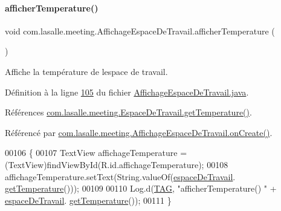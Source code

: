 \paragraph{\texorpdfstring{afficher\+Temperature()}{afficherTemperature()}}
{\footnotesize\ttfamily void com.\+lasalle.\+meeting.\+Affichage\+Espace\+De\+Travail.\+afficher\+Temperature (\begin{DoxyParamCaption}{ }\end{DoxyParamCaption})}



Affiche la température de l\textquotesingle{}espace de travail. 



Définition à la ligne \hyperlink{_affichage_espace_de_travail_8java_source_l00105}{105} du fichier \hyperlink{_affichage_espace_de_travail_8java_source}{Affichage\+Espace\+De\+Travail.\+java}.



Références \hyperlink{_espace_de_travail_8java_source_l00107}{com.\+lasalle.\+meeting.\+Espace\+De\+Travail.\+get\+Temperature()}.



Référencé par \hyperlink{_affichage_espace_de_travail_8java_source_l00041}{com.\+lasalle.\+meeting.\+Affichage\+Espace\+De\+Travail.\+on\+Create()}.


\begin{DoxyCode}
00106     \{
00107         TextView affichageTemperature = (TextView)findViewById(R.id.affichageTemperature);
00108         affichageTemperature.setText(String.valueOf(\hyperlink{classcom_1_1lasalle_1_1meeting_1_1_affichage_espace_de_travail_a934d41c1c41882b94b65a95cee5aca13}{espaceDeTravail}.
      \hyperlink{classcom_1_1lasalle_1_1meeting_1_1_espace_de_travail_a4c01c37fa6431d48c59274aaa00fdbe3}{getTemperature}()));
00109 
00110         Log.d(\hyperlink{classcom_1_1lasalle_1_1meeting_1_1_affichage_espace_de_travail_a8606eb11c7b28f52226544de431d86a4}{TAG}, \textcolor{stringliteral}{"afficherTemperature() "} + \hyperlink{classcom_1_1lasalle_1_1meeting_1_1_affichage_espace_de_travail_a934d41c1c41882b94b65a95cee5aca13}{espaceDeTravail}.
      \hyperlink{classcom_1_1lasalle_1_1meeting_1_1_espace_de_travail_a4c01c37fa6431d48c59274aaa00fdbe3}{getTemperature}());
00111     \}
\end{DoxyCode}
\mbox{\label{classcom_1_1lasalle_1_1meeting_1_1_affichage_espace_de_travail_a2f3649336aff1f2126f817c72faf30c2}} 
